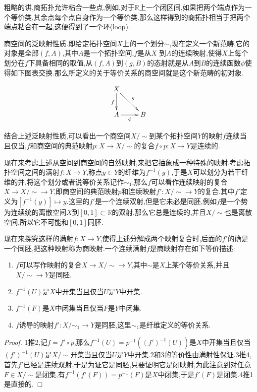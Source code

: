 粗略的讲,商拓扑允许粘合一些点,例如,对于$\mathbb{R}$上一个闭区间,如果把两个端点作为一个等价类,其余点每个点自身作为一个等价类,那么这样得到的商拓扑相当于把两个端点粘合在一起,这便得到了一个环(loop).

商空间的泛映射性质.即给定拓扑空间$X$上的一个划分$\sim$,现在定义一个新范畴,它的对象是全部$(f,A)$,其中$A$是一个拓扑空间,$f$是从$X$ 到$A$的连续映射,使得$X$上每个划分在$f$下具备相同的取值,从$(f,A)$到$(g,B)$的态射就是从$A$到$B$的连续函数$\phi$使得如下图表交换.那么所定义的关于等价关系的商空间就是这个新范畴的初对象.

$$\xymatrix{
	X\ar[d]_{f}\ar[dr]^{g}&\\
	A\ar[r]_{\phi}&B
}$$

结合上述泛映射性质,可以看出一个商空间$X/\sim$到某个拓扑空间$Y$的映射$f$连续当且仅当,$f$和商空间的典范映射$p:X\to X/\sim$的复合$f\circ p:X\to Y$是连续的.

现在来考虑上述从空间到商空间的自然映射,来把它抽象成一种特殊的映射.考虑拓扑空间之间的满射$f:X\to Y$,称点$y\in Y$的纤维为$f^{-1}(y)$,于是$X$可以划分为若干纤维的并,将这个划分或者说等价关系记作$\sim_1$,那么$f$可以看作连续映射的复合$X\to X/\sim\to Y$,即商空间的典范映射$p$和连续映射$f':X/\sim\to Y$的复合.其中$f'$定义为$[f^{-1}(y)]\mapsto y$.这里的$f'$是一个连续双射,但是它未必是同胚,例如$f$是一个势为连续统的离散空间$X$到$[0,1]\subset\mathbb{R}$的双射,那么它总是连续的,并且$X/\sim$也是离散空间,所以它不可能和$[0,1]$同胚.

现在来探究这样的满射$f:X\to Y$,使得上述分解成两个映射复合时,后面的$f'$的确是一个同胚,把这种映射称为商映射.一个连续满射$f$是商映射存在如下等价描述:
\begin{enumerate}
	\item $f$可以写作映射的复合$X\to X/\sim\to Y$,其中$\sim$是$X$上某个等价关系,并且$X/\sim\to Y$是同胚.
	\item $f^{-1}(U)$是$X$中开集当且仅当$U$是$Y$中开集.
	\item $f^{-1}(F)$是$X$中闭集当且仅当$F$是$Y$中闭集.
	\item $f$诱导的映射$f':X/\sim_1\to Y$是同胚,这里$\sim_1$是纤维定义的等价关系.
\end{enumerate}
\begin{proof}
	
	1推2,记$f=f'\circ p$,那么$f^{-1}(U)=p^{-1}((f')^{-1}(U))$是$X$中开集当且仅当$(f')^{-1}(U)$是$X/\sim$开集当且仅当$U$是$Y$中开集.2和3的等价性由满射性保证.3推4,首先$f'$已经是连续双射,于是为证它是同胚,只要证明它是闭映射,为此注意到对任意$F\in X/\sim$是闭集,有$f^{-1}(f'(F))=p^{-1}(F)$是$X$中闭集,于是$f'(F)$是闭集.4推1是直接的.
\end{proof}

